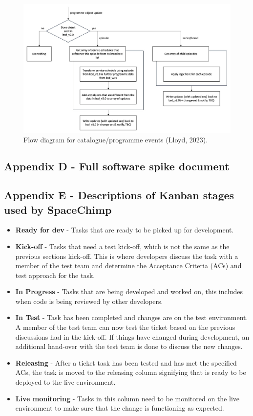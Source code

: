     \begin{figure}[H]
      \centering
      \includegraphics[width=12cm]{assets/initialDesign/programmeUpdate.jpg}
      \caption{Flow diagram for catalogue/programme events (Lloyd, 2023).}
      \label{fig:initialDesignProgrammes}
    \end{figure}

  
  \newpage
  \subsection{Appendix D - Full software spike document}
    \label{sec:AppendixD}
    

  \newpage
  \subsection{Appendix E - Descriptions of Kanban stages used by SpaceChimp}
    \label{sec:AppendixE}

    \begin{itemize}
      \item \textbf{Ready for dev} - Tasks that are ready to be picked up for development.
      \item \textbf{Kick-off} - Tasks that need a test kick-off, which is not the same as the previous sections kick-off. This is where developers
      discuss the task with a member of the test team and determine the Acceptance Criteria (ACs) and test approach for the task.
      \item \textbf{In Progress} - Tasks that are being developed and worked on, this includes when code is being reviewed by other developers.
      \item \textbf{In Test} - Task has been completed and changes are on the test environment. A member of the test team can now test the ticket
      based on the previous discussions had in the kick-off. If things have changed during development, an additional hand-over with the test team 
      is done to discuss the new changes.
      \item \textbf{Releasing} - After a ticket task has been tested and has met the specified ACs, the task is moved to the releasing column signifying 
      that is ready to be deployed to the live environment.
      \item \textbf{Live monitoring} - Tasks in this column need to be monitored on the live environment to make sure that the change is functioning as expected.
    \end{itemize}
    

